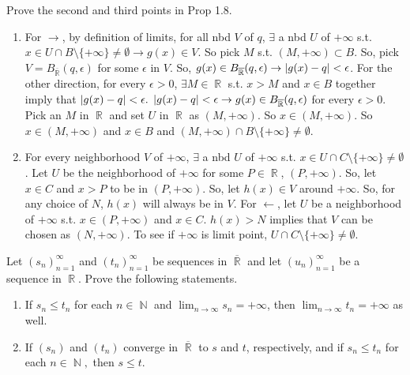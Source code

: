 \documentclass[12pt,letterpaper,boxed]{hmcpset}
\DeclareMathOperator{\N}{\mathbb{N}}
\DeclareMathOperator{\R}{\mathbb{R}}
\DeclarePairedDelimiter\abs{\lvert}{\rvert}%
\begin{document}
\begin{problem}[Exercise 1.9]
Prove the second and third points in Prop 1.8.
\end{problem}

\begin{solution}
\begin{enumerate}
    \item For $\rightarrow$, by definition of limits, for all nbd $V$ of $q$, $\exists$ a nbd $U$ of $+\infty$ s.t. $x \in U \cap B\setminus\{+\infty\}\neq\emptyset\rightarrow g(x)\in V.$ So pick $M$ s.t. $(M, +\infty)\subset B.$ So, pick $V = B_{\overline{\R}}(q,\epsilon)$ for some $\epsilon$ in $V$. So, $g(x)\in B_{\overline{\R}}(q,\epsilon) \rightarrow \abs{g(x) - q} < \epsilon$. For the other direction, for every $\epsilon > 0$, $\exists M \in \R$ s.t. $x > M$ and $x \in B$ together imply that $\abs{g(x) - q} < \epsilon.$ $\abs{g(x) - q} < \epsilon \rightarrow g(x) \in B_{\overline{\R}}(q, \epsilon)$ for every $\epsilon > 0.$ Pick an $M$ in $\R$ and set $U$ in $\R$ as  $(M, +\infty)$. So $x \in (M, + \infty)$. So $x\in (M, +\infty)$ and $x\in B$ and $(M,+\infty)\cap B \setminus \{+\infty\}\neq\emptyset.$
    \item For every neighborhood $V$ of $+\infty$, $\exists$ a nbd $U$ of $+\infty$ s.t. $x\in U\cap C \setminus \{+\infty\}\neq\emptyset$. Let $U$ be the neighborhood of $+\infty$ for some $P\in\R$, $(P,+\infty)$. So, let $x\in C$ and $x > P$ to be in $(P, +\infty)$. So, let $h(x)\in V$ around $+\infty$. So, for any choice of $N$, $h(x)$ will always be in $V$. For $\leftarrow$, let $U$ be a neighborhood of $+\infty$ s.t. $x\in (P,+\infty)$ and $x\in C$. $h(x) > N$ implies that $V$ can be chosen as $(N, +\infty)$. To see if $+\infty$ is limit point, $U\cap C \setminus \{+\infty\}\neq \emptyset.$
\end{enumerate}
\end{solution}

\begin{problem}[Exercise 4.2]
Let $(s_n)_{n=1}^{\infty}$ and $(t_n)_{n=1}^{\infty}$ be sequences in $\overline{\R}$ and let $(u_n)_{n=1}^{\infty}$ be a sequence in $\R$. Prove the following statements.
\vspace{-2mm}
    \begin{enumerate}
        \itemsep0em
        \item If $s_n \leq t_n$ for each $n\in\N$ and $\lim_{n\rightarrow \infty} s_n = + \infty$, then $\lim_{n\rightarrow \infty} t_n = + \infty$ as well.
        \item If $(s_n)$ and $(t_n)$ converge in $\overline{\R}$ to $s$ and $t$, respectively, and if $s_n \leq t_n$ for each $n\in\N,$ then $s \leq t.$
    \end{enumerate}
\end{problem}
\end{document}
